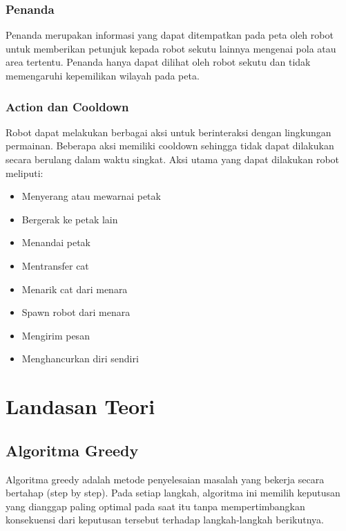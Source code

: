 \documentclass{article}
\begin{document}
\subsubsection{Penanda}

Penanda merupakan informasi yang dapat ditempatkan pada peta oleh robot untuk memberikan 
petunjuk kepada robot sekutu lainnya mengenai pola atau area tertentu.  
Penanda hanya dapat dilihat oleh robot sekutu dan tidak memengaruhi kepemilikan wilayah pada peta. 


\subsubsection{Action dan Cooldown}

Robot dapat melakukan berbagai aksi untuk berinteraksi dengan lingkungan permainan. Beberapa 
aksi memiliki cooldown sehingga tidak dapat dilakukan secara berulang dalam waktu singkat.  
Aksi utama yang dapat dilakukan robot meliputi:  

\begin{itemize}
\item Menyerang atau mewarnai petak
\item Bergerak ke petak lain
\item Menandai petak
\item Mentransfer cat
\item Menarik cat dari menara
\item Spawn robot dari menara
\item Mengirim pesan
\item Menghancurkan diri sendiri
\end{itemize}

\newpage
\section{Landasan Teori}

\subsection{Algoritma Greedy}

Algoritma greedy adalah metode penyelesaian masalah yang bekerja secara bertahap (step by step). Pada 
setiap langkah, algoritma ini memilih keputusan yang dianggap paling optimal pada saat itu tanpa 
mempertimbangkan konsekuensi dari keputusan tersebut terhadap langkah-langkah berikutnya.
\end{document}
